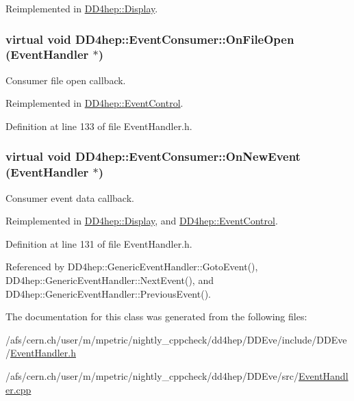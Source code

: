 Reimplemented in \hyperlink{class_d_d4hep_1_1_display_a400873f854d08d19a22939eab0bc5b5a}{DD4hep::Display}.\hypertarget{class_d_d4hep_1_1_event_consumer_a0a1c56dd7a70e28812fb68c9144ef2fa}{
\subsubsection[{OnFileOpen}]{\setlength{\rightskip}{0pt plus 5cm}virtual void DD4hep::EventConsumer::OnFileOpen ({\bf EventHandler} $\ast$)}}
\label{class_d_d4hep_1_1_event_consumer_a0a1c56dd7a70e28812fb68c9144ef2fa}


Consumer file open callback. 

Reimplemented in \hyperlink{class_d_d4hep_1_1_event_control_a651a44af5e16dd7c9f98e3ccec5971a2}{DD4hep::EventControl}.

Definition at line 133 of file EventHandler.h.\hypertarget{class_d_d4hep_1_1_event_consumer_a755b12d11f8676c4f2957f6a1f26fb31}{
\subsubsection[{OnNewEvent}]{\setlength{\rightskip}{0pt plus 5cm}virtual void DD4hep::EventConsumer::OnNewEvent ({\bf EventHandler} $\ast$)}}
\label{class_d_d4hep_1_1_event_consumer_a755b12d11f8676c4f2957f6a1f26fb31}


Consumer event data callback. 

Reimplemented in \hyperlink{class_d_d4hep_1_1_display_a6bde493af2434cc4d59fa8b6b0e58058}{DD4hep::Display}, and \hyperlink{class_d_d4hep_1_1_event_control_af3644b3a91372e313440eaca8cf893c2}{DD4hep::EventControl}.

Definition at line 131 of file EventHandler.h.

Referenced by DD4hep::GenericEventHandler::GotoEvent(), DD4hep::GenericEventHandler::NextEvent(), and DD4hep::GenericEventHandler::PreviousEvent().

The documentation for this class was generated from the following files:\begin{DoxyCompactItemize}
\item 
/afs/cern.ch/user/m/mpetric/nightly\_\-cppcheck/dd4hep/DDEve/include/DDEve/\hyperlink{_event_handler_8h}{EventHandler.h}\item 
/afs/cern.ch/user/m/mpetric/nightly\_\-cppcheck/dd4hep/DDEve/src/\hyperlink{_event_handler_8cpp}{EventHandler.cpp}\end{DoxyCompactItemize}
